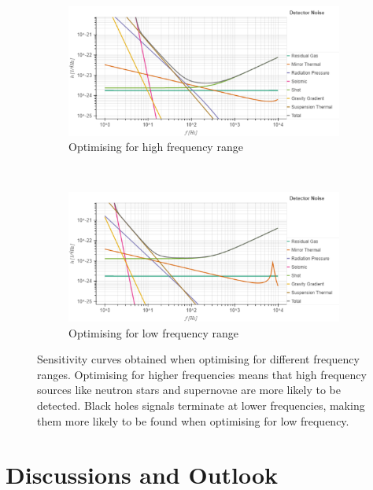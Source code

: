 \documentclass{article}
\begin{document}
    \begin{figure}[h!]
\centering
\begin{subfigure}{.8\textwidth}
        \centering
\includegraphics[width=1\linewidth, trim = {0 0 0 1cm}, clip]{HighFreq.pdf}
         \caption{Optimising for high frequency range}
         \end{subfigure}%
         \\
        \begin{subfigure}{.8\textwidth}
        \centering
        \includegraphics[width=1\linewidth, trim = {0 0 0 0.9cm}, clip]
{LowFreq.pdf}
         \caption{Optimising for low frequency range}
         \end{subfigure}
         \caption{Sensitivity curves obtained when optimising for different frequency ranges. Optimising for higher frequencies means that high frequency sources like neutron stars and supernovae are more likely to be detected. Black holes signals terminate at lower frequencies, making them more likely to be found when optimising for low frequency.}
         \label{fig::LowHighFreq}
 \end{figure}

\clearpage
\section{Discussions and Outlook}
\end{document}
